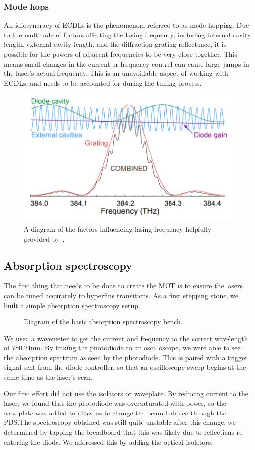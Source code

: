 \documentclass[11pt,twoside,a4paper]{article}
\begin{document}
\subsubsection{Mode hops}
An idiosyncracy of ECDLs is the phenomenom referred to as mode hopping. Due to the multitude of factors affecting the lasing frequency, including
internal cavity length, external cavity length, and the diffraction grating reflectance, it is possible for the powers of adjacent frequencies to be
very close together. This means small changes in the current or frequency control can cause large jumps in the laser's actual frequency. This is an
unavoidable aspect of working with ECDLs, and needs to be accounted for during the tuning process.
\begin{figure}[h]
    \centering
    \includegraphics[width=.5\textwidth]{images/mode-hops}
    \caption{A diagram of the factors influencing lasing frequency helpfully provided by~\cite{moglabsecd}.}
\end{figure}
\subsection{Absorption spectroscopy}
The first thing that needs to be done to create the MOT is to ensure the lasers can be tuned accurately to hyperfine transitions. As a
first stepping stone, we built a simple absorption spectroscopy setup.
\begin{figure}[h]
    \centering
    \caption{Diagram of the basic absorption spectroscopy bench.}
\end{figure}

We used a wavemeter to get the current and frequency to the correct wavelength of 780.24nm. By linking the photodiode to an oscilloscope, we were able to see the absorption
spectrum as seen by the photodiode. This is paired with a trigger signal sent from the diode controller, so that an oscilloscope sweep begins at the same time as the laser's
scan.

Our first effort did not use the isolators or waveplate. By reducing current to the laser, we found that the photodiode was oversaturated with power, so the waveplate
was added to allow us to change the beam balance through the PBS.\@ The spectroscopy obtained was still quite unstable after this change; we determined by tapping the
breadboard that this was likely due to reflections re-entering the diode. We addressed this by adding the optical isolators.
\end{document}
